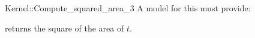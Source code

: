 \begin{ccRefFunctionObjectConcept}{Kernel::Compute_squared_area_3}
A model for this must provide:


       {returns the square of the area of $t$. }

\ccIsModel{}

\end{ccRefFunctionObjectConcept}
